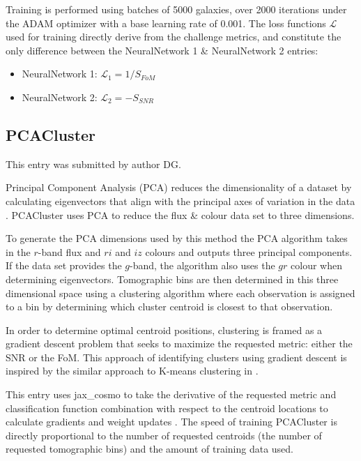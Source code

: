 \documentclass[twocolumn,twocolappendix]{aastex63}
\begin{document}
Training is performed using batches of 5000 galaxies, over 2000 iterations under the ADAM optimizer \citep{adam} with a base learning rate of 0.001. The loss functions $\mathcal{L}$ used for training directly derive from the challenge metrics, and constitute the only difference between the NeuralNetwork 1 \& NeuralNetwork 2 entries:

\begin{itemize}
	\item NeuralNetwork 1: $\mathcal{L}_1 = 1 / S_{FoM}$
	\item NeuralNetwork 2: $\mathcal{L}_2 = - S_{SNR} $
\end{itemize}  




\subsection{ {\sc PCACluster} }
This entry was submitted by author DG.

Principal Component Analysis (PCA) reduces the dimensionality of a dataset by
calculating eigenvectors that align with the principal axes of variation in the
data \citep{doi:10.1098}. {\sc PCACluster} uses PCA to reduce the flux \& colour
data set to three dimensions. 

To generate the PCA dimensions used by this method the PCA algorithm takes in
the $r$-band flux and $ri$ and $iz$ colours and outputs three principal
components.  If the data set provides the $g$-band, the algorithm also uses the
$gr$ colour when determining eigenvectors. Tomographic bins are then determined
in this three dimensional space using a clustering algorithm where each
observation is assigned to a bin by determining which cluster centroid is
closest to that observation.

In order to determine optimal centroid positions, clustering is framed as a
gradient descent problem that seeks to maximize the requested metric: either the
SNR or the FoM. This approach of identifying clusters using gradient descent is
inspired by the similar approach to K-means clustering in
\citet{NIPS1994_a1140a3d}.

This entry uses {\sc jax\_cosmo} to take the derivative of the requested metric
and classification function combination with respect to the centroid locations
to calculate gradients and weight updates \citep{jax-cosmo}.  The speed of
training PCACluster is directly proportional to the number of requested
centroids (the number of requested tomographic bins) and the amount of training
data used.
\end{document}
